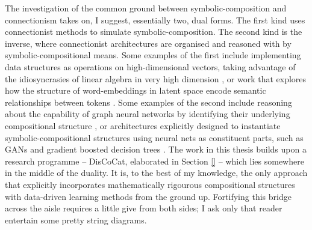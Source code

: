 The investigation of the common ground between symbolic-composition and connectionism takes on, I suggest, essentially two, dual forms. The first kind uses connectionist methods to simulate symbolic-composition. The second kind is the inverse, where connectionist architectures are organised and reasoned with by symbolic-compositional means. Some examples of the first include implementing data structures as operations on high-dimensional vectors, taking advantage of the idiosyncrasies of linear algebra in very high dimension \citep{}, or work that explores how the structure of word-embeddings in latent space encode semantic relationships between tokens \citep{}. Some examples of the second include reasoning about the capability of graph neural networks by identifying their underlying compositional structure \citep{}, or architectures explicitly designed to instantiate symbolic-compositional structures using neural nets as constituent parts, such as GANs \citep{} and gradient boosted decision trees \citep{}. The work in this thesis builds upon a research programme -- DisCoCat, elaborated in Section \ref{} -- which lies somewhere in the middle of the duality. It is, to the best of my knowledge, the only approach that explicitly incorporates mathematically rigourous compositional structures with data-driven learning methods from the ground up. Fortifying this bridge across the aisle requires a little give from both sides; I ask only that reader entertain some pretty string diagrams.


